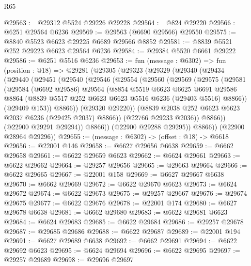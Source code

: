 \begin{lexlean}{R65}
\begin{coremodule}
{@29563 := @29312 @5524 @29226 @29228
@29564 := @824 @29220
@29566 := @6251 @29564 @6236
@29569 := @29563 (@6690 @29566) @29550
@29575 := @8840 @5523 @6623 @29225 @6689 @29566 @8852
@29581 := @8839 @5521 @252 @29223 @6623 @29564 @6236
@29584 := @29384 @5520 @6661 @29222
@29586 := @6251 @5516 @6236
@29653 := fun (message : @6302) =>
  fun (position : @18) =>
  @29281
    (@29305
      (@29323
        (@29329
          (@29340
            (@29434
              (@29440
                (@29451
                  (@29540
                    (@29546
                      (@29554
                        (@29560
                          (@29569
                            (@29575
                              (@29581
                                (@29584
                                  (@6692 @29586)
                                  @29564
                                  (@8854
                                    @5519
                                    @6623
                                    @6625
                                    @6691
                                    @29586
                                    @8864
                                    (@8839 @5517 @252 @6623 @6623 @5516 @6236 (@29403 @5516) @8866))
                                  (@29409 @153))
                                @8866))
                            (@29320 @29220))
                          (@8839 @2038 @252 @6623 @6623 @2037 @6236 (@29425 @2037) @8866))
                        (@22766 @29233 @2036))
                      @8866))
                  (@22900 @29291 @29294))
                @8866))
            (@22900 @29288 @29295))
          @8866))
      (@22900 @28964 @29296))
@29655 := (message : @6302) -> (offset : @18) -> @6618
@29656 := @22001 @146
@29658 := @6627 @29656 @6638
@29659 := @6662 @29658
@29661 := @6622 @29659 @6623
@29662 := @6624 @29661
@29663 := @6622 @29662
@29664 := @29257 @29656
@29665 := @29663 @29664
@29666 := @6622 @29665
@29667 := @22001 @158
@29669 := @6627 @29667 @6638
@29670 := @6662 @29669
@29672 := @6622 @29670 @6623
@29673 := @6624 @29672
@29674 := @6622 @29673
@29675 := @29257 @29667
@29676 := @29674 @29675
@29677 := @6622 @29676
@29678 := @22001 @174
@29680 := @6627 @29678 @6638
@29681 := @6662 @29680
@29683 := @6622 @29681 @6623
@29684 := @6624 @29683
@29685 := @6622 @29684
@29686 := @29257 @29678
@29687 := @29685 @29686
@29688 := @6622 @29687
@29689 := @22001 @194
@29691 := @6627 @29689 @6638
@29692 := @6662 @29691
@29694 := @6622 @29692 @6623
@29695 := @6624 @29694
@29696 := @6622 @29695
@29697 := @29257 @29689
@29698 := @29696 @29697
}
\end{coremodule}
\end{lexlean}
